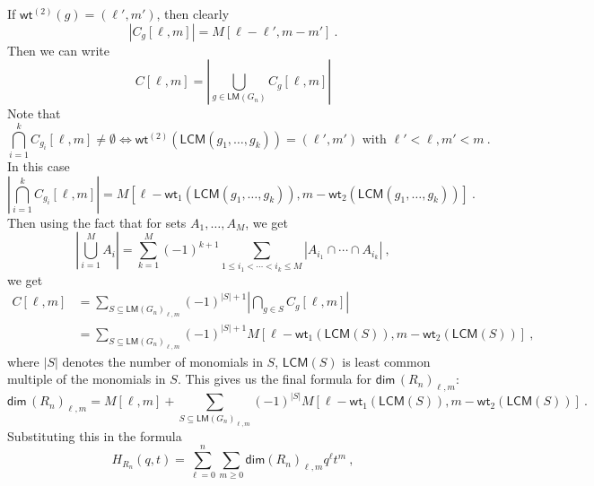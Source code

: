 \documentclass[a4paper,10pt]{article}
\newcommand{\mr}[1]{\mathsf{#1}}
\begin{document}
\begin{appendix}
\begin{equation}
\end{equation}
If $\mr{wt}^{(2)}(g)=(\ell',m')$, then clearly 
\begin{equation}
    |C_g[\ell,m]|=M[\ell-\ell',m-m']~.
\end{equation}
Then we can write 
\begin{equation}
    C[\ell,m]=\left|\bigcup_{g\in\mr{LM}(G_n)}C_g[\ell,m]\right|
\end{equation}
Note that 
\begin{equation}
    \bigcap_{i=1}^kC_{g_i}[\ell,m]\neq \emptyset\iff \mr{wt}^{(2)}(\mr{LCM}(g_1,\dots,g_k))=(\ell',m')\text{ with }\ell'<\ell,m'<m~.
\end{equation}
In this case
\begin{equation}
\left|\bigcap_{i=1}^kC_{g_i}[\ell,m]\right|=M[\ell-\mr{wt}_1(\mr{LCM}(g_1,\dots,g_k)),m-\mr{wt}_2(\mr{LCM}(g_1,\dots,g_k))]~.    
\end{equation}
Then using the fact that for sets $A_1,\dots,A_M$, we get
\begin{equation}
    \left|\bigcup_{i=1}^MA_i\right|=\sum_{k=1}^M(-1)^{k+1} \sum_{1 \leq i_1<\cdots<i_k \leq M}\left|A_{i_1} \cap \cdots \cap A_{i_k}\right|~,
\end{equation}
we get 
\begin{equation}
\begin{split}
C[\ell,m]&= \sum_{S\subseteq \mr{LM}(G_n)_{\ell,m}}(-1)^{|S|+1}\left|\bigcap_{g\in S}C_{g}[\ell,m]\right|
\\
&=\sum_{S\subseteq \mr{LM}(G_n)_{\ell,m}}(-1)^{|S|+1}M[\ell-\mr{wt}_1(\mr{LCM}(S)),m-\mr{wt}_2(\mr{LCM}(S))]~,
\end{split}
\end{equation}
where $|S|$ denotes the number of monomials in $S$, $\mr{LCM}(S)$ is least common multiple of the monomials in $S$. This gives us the final formula for $\mr{dim}\,(R_n)_{\ell,m}$:
\begin{equation}
    \mr{dim}\,(R_n)_{\ell,m}=M[\ell,m]+\sum_{S\subseteq \mr{LM}(G_n)_{\ell,m}}(-1)^{|S|}M[\ell-\mr{wt}_1(\mr{LCM}(S)),m-\mr{wt}_2(\mr{LCM}(S))]~.
\end{equation}
Substituting this in the formula
\begin{equation}
H_{R_n}(q, t)=\sum_{\ell=0}^n \sum_{m \geq 0} \mr{dim}\left(R_n\right)_{\ell, m} q^{\ell} t^m~,

\end{equation}
\end{appendix}
\end{document}
